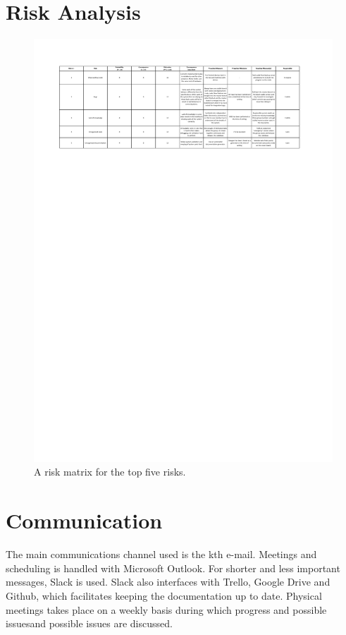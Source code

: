 \documentclass[11pt, titlepage]{article} %
\begin{document}
\section{Risk Analysis}
\begin{figure}
    \centering
    \includegraphics{risks.pdf}
    \caption{A risk matrix for the top five risks.}
    \label{fig:risks}
\end{figure}

\section{Communication}
The main communications channel used is the kth e-mail. Meetings and
scheduling is handled with Microsoft Outlook. For shorter and less
important messages, Slack is used. Slack also interfaces with 
Trello, Google Drive and Github, which facilitates keeping the
documentation up to date. Physical meetings takes place on a
weekly basis during which progress and possible issuesand possible issues are discussed.
\end{document}
